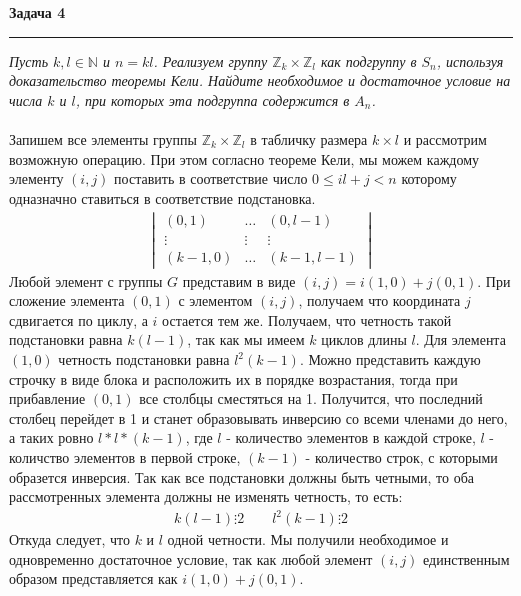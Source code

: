 \documentclass[a4paper,11pt]{article}
\begin{document}
\textbf{\large Задача 4}
\medskip\hrule\medskip
\textit{Пусть $ k, l \in \mathbb{N} $ и $ n = kl $. Реализуем группу $ \mathbb{Z}_k \times \mathbb{Z}_l $ как подгруппу в $ S_n $, используя доказательство теоремы Кели. Найдите необходимое и достаточное условие на числа $ k $ и $ l $, при которых эта подгруппа содержится в $ A_n $.} \\ \\
Запишем все элементы группы $ \mathbb{Z}_k \times \mathbb{Z}_l $ в табличку размера $ k \times l $ и рассмотрим возможную операцию. При этом согласно теореме Кели, мы можем каждому элементу $ (i, j) $ поставить в соответствие число $ 0 \leqslant il + j < n $ которому одназначно ставиться в соответствие подстановка. 
\begin{gather*}
\begin{vmatrix}
(0, 1) & \dots & (0, l - 1) \\[2pt]
\vdots & \vdots & \vdots \\[2pt]
(k - 1, 0) & \dots & (k - 1, l - 1)
\end{vmatrix}
\end{gather*}
Любой элемент $ с $ группы $ G $ представим в виде $ (i, j) = i(1, 0) + j(0, 1) $. При сложение  элемента $ (0, 1) $ с элементом $ (i, j) $, получаем что координата $ j $ сдвигается по циклу, а $ i $ остается тем же. Получаем, что четность такой подстановки равна $ k(l - 1) $, так как мы имеем  $ k $ циклов длины $ l $. Для элемента $ (1, 0) $ четность подстановки равна $ l^2(k - 1) $. Можно представить каждую строчку в виде блока и расположить их в порядке возрастания, тогда при прибавление $ (0, 1) $ все столбцы сместяться на 1. Получится, что последний столбец перейдет в 1 и станет образовывать инверсию со всеми членами до него, а таких ровно $ l * l * (k - 1) $, где  $ l $ - количество элементов в каждой строке, $ l $ - количство элементов в первой строке, $ (k - 1) $ - количество строк, с которыми образется инверсия. Так как все подстановки должны быть четными, то оба рассмотренных элемента должны не изменять четность, то есть:
\begin{gather*}
k(l - 1) \vdots 2 \qquad l^2(k - 1) \vdots 2
\end{gather*}
Откуда следует, что $ k $ и $ l $ одной четности. Мы получили необходимое и одновременно достаточное условие, так как любой элемент $ (i, j) $ единственным образом представляется как $ i(1, 0) + j(0, 1) $. 
\end{document}
